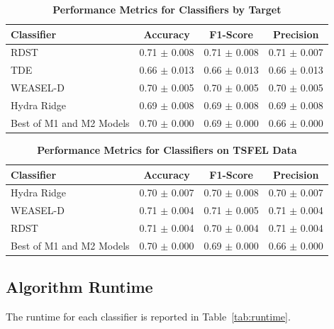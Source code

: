 \documentclass{ieeeaccess}
\begin{document}
\begin{table}[!h]
    \caption{\textbf{Performance Metrics for Classifiers by Target}}
    \label{tab:results_target}
    \centering
    \setlength{\tabcolsep}{3pt}
    \begin{tabular}{|l|c|c|c|}
    \hline
    \textbf{Classifier} & \textbf{Accuracy} & \textbf{F1-Score} & \textbf{Precision} \\ 
    \hline
    RDST                & 0.71 $\pm$ 0.008 & 0.71 $\pm$ 0.008 & 0.71 $\pm$ 0.007 \\ 
    TDE                 & 0.66 $\pm$ 0.013 & 0.66 $\pm$ 0.013 & 0.66 $\pm$ 0.013 \\ 
    WEASEL-D            & 0.70 $\pm$ 0.005 & 0.70 $\pm$ 0.005 & 0.70 $\pm$ 0.005 \\ 
    Hydra Ridge         & 0.69 $\pm$ 0.008 & 0.69 $\pm$ 0.008 & 0.69 $\pm$ 0.008 \\ 
    Best of M1 and M2 Models & 0.70 $\pm$ 0.000 & 0.69 $\pm$ 0.000 & 0.66 $\pm$ 0.000 \\ 
    \hline
    \end{tabular}
    \end{table}
        
\begin{table}[!h]
    \caption{\textbf{Performance Metrics for Classifiers on TSFEL Data}}
    \label{tab:results_tsfel}
    \centering
    \setlength{\tabcolsep}{3pt}
    \begin{tabular}{|l|c|c|c|}
    \hline
    \textbf{Classifier} & \textbf{Accuracy} & \textbf{F1-Score} & \textbf{Precision} \\ 
    \hline
    Hydra Ridge         & 0.70 $\pm$ 0.007 & 0.70 $\pm$ 0.008 & 0.70 $\pm$ 0.007 \\ 
    WEASEL-D            & 0.71 $\pm$ 0.004 & 0.71 $\pm$ 0.005 & 0.71 $\pm$ 0.004 \\ 
    RDST                & 0.71 $\pm$ 0.004 & 0.70 $\pm$ 0.004 & 0.71 $\pm$ 0.004 \\ 
    Best of M1 and M2 Models & 0.70 $\pm$ 0.000 & 0.69 $\pm$ 0.000 & 0.66 $\pm$ 0.000 \\ 
    \hline
    \end{tabular}
    \end{table}
        
\subsection{Algorithm Runtime}
The runtime for each classifier is reported in Table~\ref{tab:runtime}.
\end{document}
